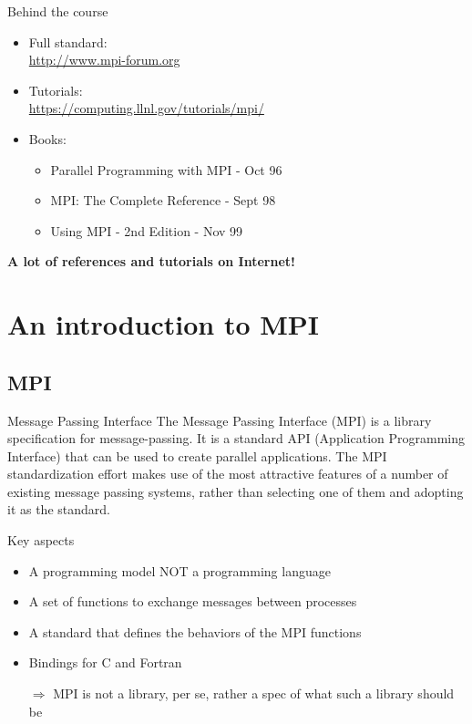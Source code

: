 \documentclass[aspectratio=43]{beamer}
\begin{document}
\begin{frame}{Behind the course}
\begin{itemize}
    \item Full standard:\\\url{http://www.mpi-forum.org}
    \item Tutorials:\\\url{https://computing.llnl.gov/tutorials/mpi/}
    \item Books:
    \begin{itemize}
        \item Parallel Programming with MPI - Oct 96
        \item MPI: The Complete Reference - Sept 98
        \item Using MPI - 2nd Edition - Nov 99
    \end{itemize}
\end{itemize}
    {\textbf{A lot of references and tutorials on Internet!}}
\end{frame}


\section{An introduction to MPI}


\subsection{MPI}
\begin{frame}{Message Passing Interface}
\justifying
\small
The Message Passing Interface (MPI) is a library specification for message-passing.
It is a standard API (Application Programming Interface) that can be used to create parallel applications.
The MPI standardization effort makes use of the most attractive features of a number of existing message passing systems, rather than selecting one of them and adopting it as the standard.\\
\begin{blue2block}{Key aspects}
\begin{itemize}
    \item A programming model NOT a programming language
    \item A set of functions to exchange messages between processes
    \item A standard that defines the behaviors of the MPI functions
    \item Bindings for C and Fortran
    \item[\color{cscsred}$\Rightarrow$] MPI is not a library, per se, rather a spec of what such a library should be
\end{itemize}
\end{blue2block}
\end{frame}
\end{document}
